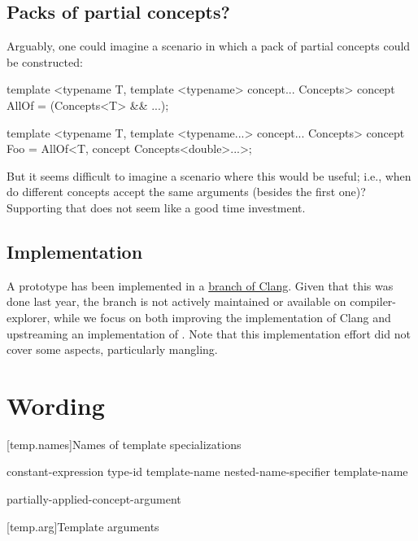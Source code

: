 \documentclass{wg21}
\begin{document}
\subsection{Packs of partial concepts?}

Arguably, one could imagine a scenario in which a pack of partial concepts could be constructed:

\begin{colorblock}
template <typename T, template <typename> concept... Concepts>
concept AllOf  = (Concepts<T> && ...);

template <typename T, template <typename...> concept... Concepts>
concept Foo = AllOf<T, concept Concepts<double>...>;
\end{colorblock}

But it seems difficult to imagine a scenario where this would be useful; i.e., when do different concepts accept the same arguments (besides the first one)?
Supporting that does not seem like a good time investment.


\subsection{Implementation}

A prototype has been implemented in a \href{https://github.com/cor3ntin/llvm-project/commit/7fb869e9b6571629258081674de03279ad60ffd3}{branch of Clang}.
Given that this was done last year, the branch is not actively maintained or available on compiler-explorer, while we focus on both improving the implementation of Clang and upstreaming an implementation of .
Note that this implementation effort did not cover some aspects, particularly mangling.

\section{Wording}

[temp.names]{Names of template specializations}


\begin{bnf}
\br
constant-expression\br
type-id\br
{} template-name\br
nested-name-specifier  template-name\br
\begin{addedblock}
partially-applied-concept-argument
\end{addedblock}
\end{bnf}


[temp.arg]{Template arguments}
\end{document}
